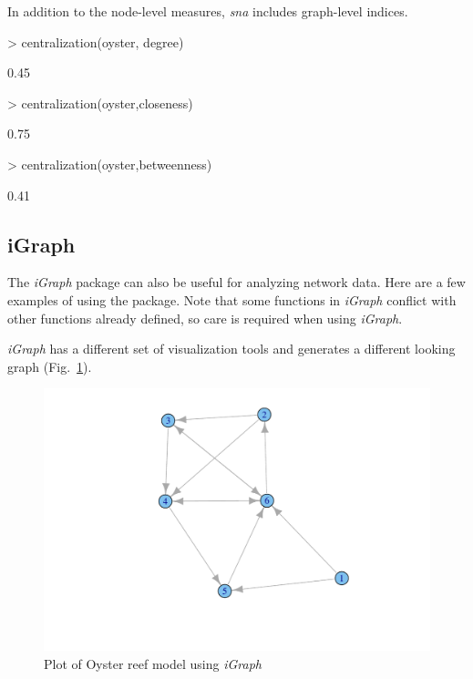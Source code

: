 \documentclass[article]{jss}
\begin{document}
In addition to the node-level measures, \textit{sna} includes graph-level
indices.

\begin{Schunk}
\begin{Sinput}
> centralization(oyster, degree)
\end{Sinput}
\begin{Soutput}
[1] 0.45
\end{Soutput}
\begin{Sinput}
> centralization(oyster,closeness)
\end{Sinput}
\begin{Soutput}
[1] 0.75
\end{Soutput}
\begin{Sinput}
> centralization(oyster,betweenness)
\end{Sinput}
\begin{Soutput}
[1] 0.41
\end{Soutput}
\end{Schunk}

\subsection{iGraph}
The \textit{iGraph} package can also be useful for analyzing network
data.  Here are a few examples of using the package.  Note that some
functions in \textit{iGraph} conflict with other functions already defined, so
care is required when using \textit{iGraph}.

\begin{Schunk}
\end{Schunk}

\textit{iGraph} has a different set of visualization tools and
generates a different looking graph (Fig.~\ref{fig:igraph}).

\begin{figure}
\center
\includegraphics{enaR-vignette-058}
\caption{Plot of Oyster reef model using \textit{iGraph}}\label{fig:igraph}
\end{figure}
\end{document}
